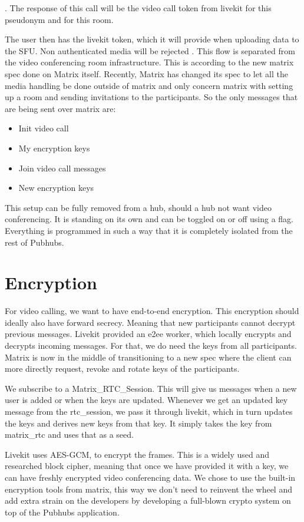 \documentclass{report}
\begin{document}
. The response of this call will be the video call token from livekit for this pseudonym and for this room. 

The user then has the livekit token, which it will provide when uploading data to the SFU. Non authenticated media will be rejected . This flow is separated from the video conferencing room infrastructure. This is according to the new matrix spec done on Matrix itself. Recently, Matrix has changed its spec to let all the media handling be done outside of matrix and only concern matrix with setting up a room and sending invitations to the participants. So the only messages that are being sent over matrix are:

\begin{itemize}
    \item Init video call
    \item My encryption keys
    \item Join video call messages
    \item New encryption keys
\end{itemize}

This setup can be fully removed from a hub, should a hub not want video conferencing. It is standing on its own and can be toggled on or off using a flag. Everything is programmed in such a way that it is completely isolated from the rest of Pubhubs. 

\section{Encryption}

For video calling, we want to have end-to-end encryption. This encryption should ideally also have forward secrecy. Meaning that new participants cannot decrypt previous messages. Livekit provided an e2ee worker, which locally encrypts and decrypts incoming messages. For that, we do need the keys from all participants. Matrix is now in the middle of transitioning to a new spec where the client can more directly request, revoke and rotate keys of the participants.

We subscribe to a Matrix\_RTC\_Session. This will give us messages when a new user is added or when the keys are updated. Whenever we get an updated key message from the rtc\_session, we pass it through livekit, which in turn updates the keys and derives new keys from that key. It simply takes the key from matrix\_rtc and uses that as a seed.

Livekit uses AES-GCM, to encrypt the frames. This is a widely used and researched block cipher, meaning that once we have provided it with a key, we can have freshly encrypted video conferencing data. We chose to use the built-in encryption tools from matrix, this way we don't need to reinvent the wheel and add extra strain on the developers by developing a full-blown crypto system on top of the Pubhubs application.
\end{document}
